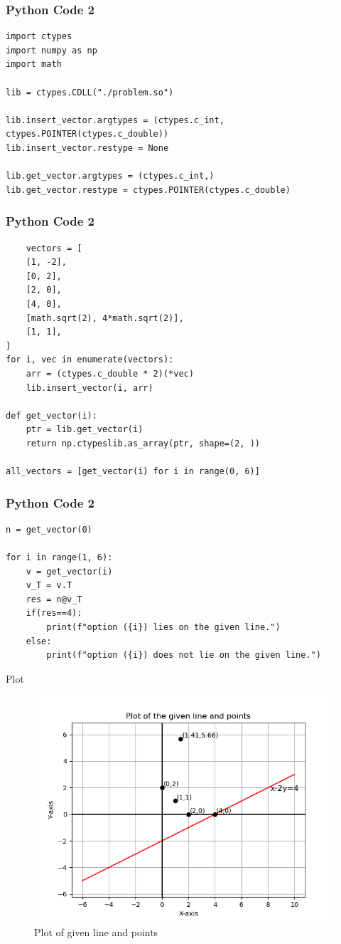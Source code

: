 \documentclass{beamer}
\begin{document}
\begin{frame}[fragile]
    \frametitle{Python Code 2}
    \begin{lstlisting}
import ctypes
import numpy as np
import math

lib = ctypes.CDLL("./problem.so")

lib.insert_vector.argtypes = (ctypes.c_int, ctypes.POINTER(ctypes.c_double))
lib.insert_vector.restype = None

lib.get_vector.argtypes = (ctypes.c_int,)
lib.get_vector.restype = ctypes.POINTER(ctypes.c_double)

    \end{lstlisting}
\end{frame}

\begin{frame}[fragile]
    \frametitle{Python Code 2}
    \begin{lstlisting}
    vectors = [
    [1, -2],
    [0, 2],
    [2, 0],
    [4, 0],
    [math.sqrt(2), 4*math.sqrt(2)],
    [1, 1],
]
for i, vec in enumerate(vectors):
    arr = (ctypes.c_double * 2)(*vec)
    lib.insert_vector(i, arr)

def get_vector(i):
    ptr = lib.get_vector(i)
    return np.ctypeslib.as_array(ptr, shape=(2, ))

all_vectors = [get_vector(i) for i in range(0, 6)]
    \end{lstlisting}
\end{frame}

\begin{frame}[fragile]
    \frametitle{Python Code 2}
    \begin{lstlisting}
n = get_vector(0)

for i in range(1, 6):
    v = get_vector(i)
    v_T = v.T
    res = n@v_T
    if(res==4):
        print(f"option ({i}) lies on the given line.")
    else:
        print(f"option ({i}) does not lie on the given line.") 
    \end{lstlisting}
\end{frame}





\begin{frame}{Plot}
    \begin{figure}
        \centering
        \includegraphics[width=0.5\columnwidth]{../figs/plot.png}
        \caption{Plot of given line and points}
        \label{fig:fig}
    \end{figure}
\end{frame}
\end{document}
